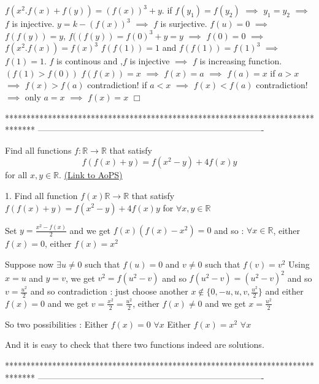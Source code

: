 \begin{solution}
	$ f(x^{2}.f(x) + f(y)) = (f(x))^{3} + y$.
if  $ f(y_{1}) = f(y_{2})$  $ \implies$  $ y_{1} = y_{2}$  $ \implies$ $ f$  is injective.
$ y = k - (f(x))^{3}$ $ \implies$  $ f$ is surjective.
$ f(u) = 0$  $ \implies$  $ f(f(y)) = y$,
$ f((f(y)) = f(0)^{3} + y = y$  $ \implies$  $ f(0) = 0$ $ \implies$  $ f(x^{2}.f(x)) = f(x)^{3}$
$ f(f(1)) = 1$ and $ f(f(1)) = f(1)^{3}$  $ \implies$  $ f(1) = 1$.
$ f$  is continous and ,$ f$ is injective $ \implies$  $ f$ is increasing function.$ (f(1)>f(0))$
$ f(f(x)) = x$  $ \implies$  $ f(x) = a$  $ \implies$ $ f(a) = x$
if $ a > x$ $ \implies$  $ f(x) > f(a)$ contradiction!
if $ a < x$  $ \implies$  $ f(x) < f(a)$  contradiction!
$ \implies$  only $ a = x$  $ \implies$  $ f(x) = x$ $ \Box$
\end{solution}
*******************************************************************************
-------------------------------------------------------------------------------

\begin{problem}
	Find all functions $ f:\mathbb{R} \rightarrow \mathbb{R}$ that satisfy \[ f(f(x)+y) = f(x^2 - y) + 4f(x)y\] for all $ x,y \in \mathbb{R}$.
	\flushright \href{https://artofproblemsolving.com/community/c6h301125}{(Link to AoPS)}
\end{problem}



\begin{solution}
	\begin{tcolorbox}1. Find all function $ f(x) \mathbb{R} \rightarrow \mathbb{R}$ that satisfy  $ f(f(x) + y) = f(x^2 - y) + 4f(x)y$  for $ \forall x,y \in \mathbb{R}$  \end{tcolorbox}
Set $ y=\frac{x^2-f(x)}2$ and we get $ f(x)(f(x)-x^2)=0$ and so : $ \forall x\in\mathbb R$, either $ f(x)=0$, either $ f(x)=x^2$

Suppose now $ \exists u\neq 0$ such that $ f(u)=0$ and $ v\neq 0$ such that $ f(v)=v^2$
Using $ x=u$ and $ y=v$, we get $ v^2=f(u^2-v)$ and so $ f(u^2-v)=(u^2-v)^2$ and so $ v=\frac{u^2}2$ and so contradiction : just choose another $ x\notin\{0,-u,u,v,\frac {u^2}2\}$ and either $ f(x)=0$ and we get $ v=\frac{x^2}2=\frac {u^2}2$, either $ f(x)\neq 0$ and we get $ x=\frac{u^2}2$

So two possibilities :
Either $ f(x)=0$ $ \forall x$
Either $ f(x)=x^2$ $ \forall x$

And it is easy to check that there two functions indeed are solutions.
\end{solution}
*******************************************************************************
-------------------------------------------------------------------------------

